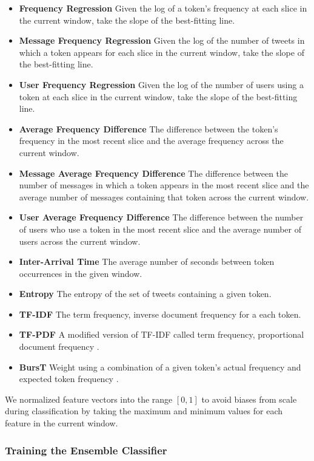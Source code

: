 \documentclass{acm_proc_article-sp}
\begin{document}
\begin{itemize}
\item \textbf{Frequency Regression} Given the log of a token's frequency at each slice in the current window, take the slope of the best-fitting line.
\item \textbf{Message Frequency Regression} Given the log of the number of tweets in which a token appears for each slice in the current window, take the slope of the best-fitting line.
\item \textbf{User Frequency Regression} Given the log of the number of users using a token at each slice in the current window, take the slope of the best-fitting line.
\item \textbf{Average Frequency Difference} The difference between the token's frequency in the most recent slice and the average frequency across the current window.
\item \textbf{Message Average Frequency Difference} The difference between the number of messages in which a token appears in the most recent slice and the average number of messages containing that token across the current window.
\item \textbf{User Average Frequency Difference} The difference between the number of users who use a token in the most recent slice and the average number of users across the current window.
\item \textbf{Inter-Arrival Time} The average number of seconds between token occurrences in the given window.
\item \textbf{Entropy} The entropy of the set of tweets containing a given token.
\item \textbf{TF-IDF} The term frequency, inverse document frequency for a each token.
\item \textbf{TF-PDF} A modified version of TF-IDF called term frequency, proportional document frequency \cite{Bun:2002:TEN:645962.674082}.
\item \textbf{BursT} Weight using a combination of a given token's actual frequency and expected token frequency \cite{Lee:2011:BDT:2009463.2009531}.
\end{itemize}

We normalized feature vectors into the range $[0, 1]$ to avoid biases from scale during classification by taking the maximum and minimum values for each feature in the current window.

\subsubsection{Training the Ensemble Classifier}
\end{document}
